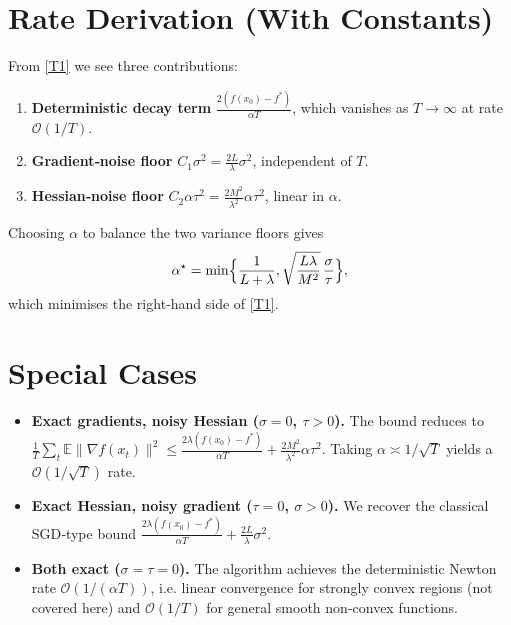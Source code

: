 \documentclass{article}
\newcommand{\EE}{\mathbb{E}}
\begin{document}
\section*{Rate Derivation (With Constants)}
From \eqref{T1} we see three contributions:
\begin{enumerate}
\item \textbf{Deterministic decay term}
  $\displaystyle\frac{2(f(x_0)-f^{*})}{\alpha T}$,
  which vanishes as $T\to\infty$ at rate $\mathcal{O}(1/T)$.
\item \textbf{Gradient‑noise floor}
  $C_{1}\sigma^{2}= \frac{2L}{\lambda}\sigma^{2}$,
  independent of $T$.
\item \textbf{Hessian‑noise floor}
  $C_{2}\alpha\tau^{2}= \frac{2M^{2}}{\lambda^{2}}\alpha\tau^{2}$,
  linear in $\alpha$.
\end{enumerate}
Choosing $\alpha$ to balance the two variance floors gives
\[
\alpha^{\star}= \min\Bigl\{\frac{1}{L+\lambda},
      \sqrt{\frac{L\lambda}{M^{2}}}\,\frac{\sigma}{\tau}\Bigr\},
\]
which minimises the right‑hand side of \eqref{T1}.

\section*{Special Cases}
\begin{itemize}
\item \textbf{Exact gradients, noisy Hessian ($\sigma=0$, $\tau>0$).}
  The bound reduces to
  $\displaystyle\frac{1}{T}\sum_{t}\EE\|\nabla f(x_t)\|^{2}
   \le \frac{2\lambda(f(x_0)-f^{*})}{\alpha T}
   +\frac{2M^{2}}{\lambda^{2}}\alpha\tau^{2}$.
  Taking $\alpha\asymp 1/\sqrt{T}$ yields a $\mathcal{O}(1/\sqrt{T})$ rate.
\item \textbf{Exact Hessian, noisy gradient ($\tau=0$, $\sigma>0$).}
  We recover the classical SGD‑type bound
  $\displaystyle\frac{2\lambda(f(x_0)-f^{*})}{\alpha T}
   +\frac{2L}{\lambda}\sigma^{2}$.
\item \textbf{Both exact ($\sigma=\tau=0$).}
  The algorithm achieves the deterministic Newton rate
  $\mathcal{O}(1/(\alpha T))$, i.e. linear convergence for strongly
  convex regions (not covered here) and $\mathcal{O}(1/T)$ for general
  smooth non‑convex functions.
\end{itemize}
\end{document}
